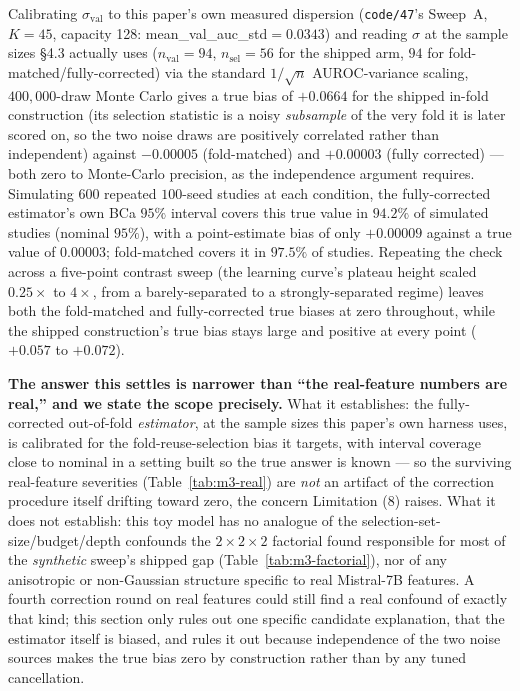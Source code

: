 \documentclass[10pt]{article} %
\begin{document}
Calibrating $\sigma_{\text{val}}$ to this paper's own measured dispersion
(\texttt{code/47}'s Sweep~A, $K{=}45$, capacity 128:
mean\_val\_auc\_std$=0.0343$) and reading $\sigma$ at the sample sizes
\S4.3 actually uses ($n_{\text{val}}=94$, $n_{\text{sel}}=56$ for the shipped
arm, $94$ for fold-matched/fully-corrected) via the standard $1/\sqrt{n}$
AUROC-variance scaling, $400{,}000$-draw Monte Carlo gives a true bias of
$+0.0664$ for the shipped in-fold construction (its selection statistic is a
noisy \emph{subsample} of the very fold it is later scored on, so the two
noise draws are positively correlated rather than independent) against
$-0.00005$ (fold-matched) and $+0.00003$ (fully corrected) --- both zero to
Monte-Carlo precision, as the independence argument requires. Simulating
$600$ repeated $100$-seed studies at each condition, the fully-corrected
estimator's own BCa $95\%$ interval covers this true value in $94.2\%$ of
simulated studies (nominal $95\%$), with a point-estimate bias of only
$+0.00009$ against a true value of $0.00003$; fold-matched covers it in
$97.5\%$ of studies. Repeating the check across a five-point contrast sweep
(the learning curve's plateau height scaled $0.25\times$ to $4\times$, from
a barely-separated to a strongly-separated regime) leaves both the fold-matched
and fully-corrected true biases at zero throughout, while the shipped
construction's true bias stays large and positive at every point
($+0.057$ to $+0.072$).

\textbf{The answer this settles is narrower than ``the real-feature numbers
are real,'' and we state the scope precisely.} What it establishes: the
fully-corrected out-of-fold \emph{estimator}, at the sample sizes this
paper's own harness uses, is calibrated for the fold-reuse-selection bias it
targets, with interval coverage close to nominal in a setting built so the
true answer is known --- so the surviving real-feature severities
(Table~\ref{tab:m3-real}) are \emph{not} an artifact of the correction
procedure itself drifting toward zero, the concern Limitation (8) raises.
What it does not establish: this toy model has no analogue of the
selection-set-size/budget/depth confounds the $2\times2\times2$ factorial
found responsible for most of the \emph{synthetic} sweep's shipped gap
(Table~\ref{tab:m3-factorial}), nor of any anisotropic or non-Gaussian
structure specific to real Mistral-7B features. A fourth correction round on
real features could still find a real confound of exactly that kind; this
section only rules out one specific candidate explanation, that the estimator
itself is biased, and rules it out because independence of the two noise
sources makes the true bias zero by construction rather than by any tuned
cancellation.
\end{document}
